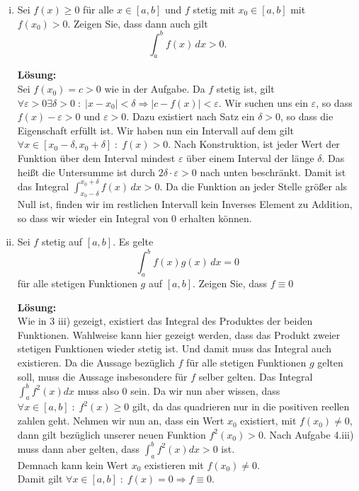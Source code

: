 \documentclass[11pt,a4paper,ngerman]{article}
\begin{document}
\begin{enumerate}[i)]
    \item Sei $f(x) \geq 0$ für alle $x \in [a,b]$ und $f$ stetig mit $x_0 \in [a,b]$ mit $f(x_0) > 0$. Zeigen Sie, dass dann auch gilt
$$
    \int_{a}^{b} f(x) \, dx > 0.
$$

\textbf{Lösung:}\\

Sei $f(x_0) = c > 0$ wie in der Aufgabe. Da $f$ stetig ist, gilt $\forall \varepsilon > 0 \exists \delta > 0 \; : \; |x - x_0| < \delta \Rightarrow | c - f(x) | < \varepsilon$. Wir suchen uns ein $\varepsilon$, so dass $f(x) - \varepsilon > 0$ und $\varepsilon > 0$. Dazu existiert nach Satz ein $ \delta > 0$, so dass die Eigenschaft erfüllt ist. Wir haben nun ein Intervall auf dem gilt $\forall x \in [x_0 - \delta, x_0 + \delta] \; : \; f(x) > 0$. Nach Konstruktion, ist jeder Wert der Funktion über dem Interval mindest $\varepsilon$ über einem Interval der länge $\delta$. Das heißt die Untersumme ist durch $2\delta \cdot \varepsilon > 0$ nach unten beschränkt. Damit ist das Integral $\int_{x_0 - \delta}^{x_0+\delta} f(x) \, dx > 0$. Da die Funktion an jeder Stelle größer als Null ist, finden wir im restlichen Intervall kein Inverses Element zu Addition, so dass wir wieder ein Integral von 0 erhalten können. 

    \item Sei $f$ stetig auf $[a,b]$. Es gelte
$$
\int_{a}^{b} f(x)g(x) \, dx = 0
$$
für alle stetigen Funktionen $g$ auf $[a,b]$. Zeigen Sie, dass $f\equiv 0$

\textbf{Lösung:}\\
Wie in 3 iii) gezeigt, existiert das Integral des Produktes der beiden Funktionen. Wahlweise kann hier gezeigt werden, dass das Produkt zweier stetigen Funktionen wieder stetig ist. Und damit muss das Integral auch existieren.
Da die Aussage bezüglich $f$ für alle stetigen Funktionen $g$ gelten soll, muss die Aussage insbesondere für $f$ selber gelten. Das Integral $\int_a^b f^2 (x) dx$ muss also 0 sein. Da wir nun aber wissen, dass $\forall x \in [a,b] \; : \; f^2(x) \geq 0$ gilt, da das quadrieren nur in die positiven reellen zahlen geht. Nehmen wir nun an, dass ein Wert $x_0$ existiert, mit $f(x_0) \not=0$, dann gilt bezüglich unserer neuen Funktion $f^2(x_0) > 0$. Nach Aufgabe 4.iii) muss dann aber gelten, dass $\int_a^b f^2(x) dx > 0$ ist.\\

Demnach kann kein Wert $x_0$ existieren mit $f(x_0) \not= 0$.\\ Damit gilt $\forall x \in [a,b] \; : \; f(x) = 0 \Rightarrow f \equiv 0$.


\end{enumerate}
\label{LastPage}
\end{document}

